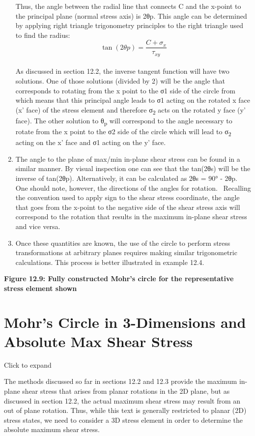 \documentclass[
  letterpaper,
  DIV=11,
  numbers=noendperiod]{scrreprt}
\begin{document}
\begin{enumerate}
  Thus, the angle between the radial line that connects C and the
  x-point to the principal plane (normal stress axis) is 2θp. This angle
  can be determined by applying right triangle trigonometry principles
  to the right triangle used to find the radius:\\
  \[
  \tan (2 \theta p)=\frac{C+\sigma_x}{\tau_{x y}}
  \]\\
  As discussed in section 12.2, the inverse tangent function will have
  two solutions. One of those solutions (divided by 2) will be the angle
  that corresponds to rotating from the x point to the σ1 side of the
  circle from which means that this principal angle leads to σ1 acting
  on the rotated x face (x' face) of the stress element and therefore
  σ\textsubscript{2} acts on the rotated y face (y' face). The other
  solution to θ\textsubscript{p} will correspond to the angle necessary
  to rotate from the x point to the σ2 side of the circle which will
  lead to σ\textsubscript{2} acting on the x' face and σ1 acting on the
  y' face.
\item
  The angle to the plane of max/min in-plane shear stress can be found
  in a similar manner. By visual inspection one can see that the
  tan(2θs) will be the inverse of tan(2θp). Alternatively, it can be
  calculated as 2θs = 90° - 2θp. One should note, however, the
  directions of the angles for rotation. ~Recalling the convention used
  to apply sign to the shear stress coordinate, the angle that goes from
  the x-point to the negative side of the shear stress axis will
  correspond to the rotation that results in the maximum in-plane shear
  stress and vice versa.
\item
  Once these quantities are known, the use of the circle to perform
  stress transformations at arbitrary planes requires making similar
  trigonometric calculations. This process is better illustrated in
  example 12.4.
\end{enumerate}

\textbf{Figure 12.9: Fully constructed Mohr's circle for the
representative stress element shown}

\section{Mohr's Circle in 3-Dimensions and Absolute Max Shear
Stress}\label{mohrs-circle-in-3-dimensions-and-absolute-max-shear-stress}

Click to expand

The methods discussed so far in sections 12.2 and 12.3 provide the
maximum in-plane shear stress that arises from planar rotations in the
2D plane, but as discussed in section 12.2, the actual maximum shear
stress may result from an out of plane rotation. Thus, while this text
is generally restricted to planar (2D) stress states, we need to
consider a 3D stress element in order to determine the absolute maximum
shear stress.
\end{document}
